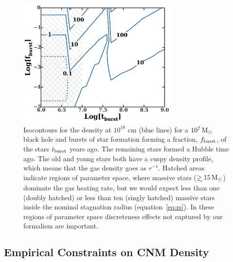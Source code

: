 \documentclass[usenatbib,fleqn]{mnras}
\newcommand\gsim{\mathrel{\rlap{\lower4pt\hbox{\hskip1pt$\sim$}}
    \raise1pt\hbox{$>$}}}
\newcommand{\Msun}{{\rm M_\odot}}
\begin{document}
\begin{figure} 
  \includegraphics[width=8cm]{cnm_plot.pdf}
  \caption{\label{fig:param} Isocontours for the density at $10^{18}$
    cm (blue lines) for a $10^{7} \, \Msun$ black hole and bursts of
    star formation forming a fraction, $f_{\rm burst}$, of the stars
    $t_{\rm burst}$ years ago. The remaining stars formed a Hubble
    time ago. The old and young stars both have a cuspy density
    profile, which means that the gas density goes as $r^{-1}$.
    Hatched areas indicate regions of parameter space, where massive
    stars ($\gsim 15 \, \Msun$) dominate the gas heating rate, but we
    would expect less than one (doubly hatched) or less than ten
    (singly hatched) massive stars inside the nominal stagnation
    radius (equation~\ref{eq:rs}). In these regions of parameter space
    discreteness effects not captured by our formalism are important.}
\end{figure}



\subsection{Empirical Constraints on CNM Density}
\label{sec:empirical}
\end{document}
